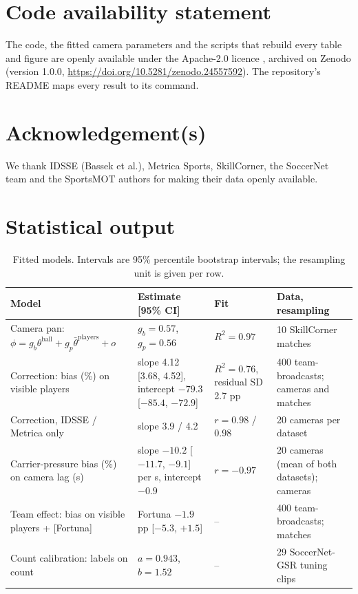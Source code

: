 \documentclass[]{interact}
\begin{document}
\section*{Code availability statement}
The code, the fitted camera parameters and the scripts that rebuild every table and figure are openly available under
the Apache-2.0 licence \citep{pitchlens}, archived on Zenodo (version 1.0.0,
\url{https://doi.org/10.5281/zenodo.24557592}). The repository's README maps every result to its command.

\section*{Acknowledgement(s)}
We thank IDSSE (Bassek et al.), Metrica Sports, SkillCorner, the SoccerNet team and the SportsMOT authors for making
their data openly available.




\appendix
\section{Statistical output}
\label{app:stats}

\begin{table}[ht]
\centering
\caption{Fitted models. Intervals are 95\% percentile bootstrap intervals; the resampling unit is given per row.}
\label{tab:models}
\small
\begin{tabular}{p{3.4cm}p{3.9cm}p{1.9cm}p{2.6cm}}
\toprule
Model & Estimate [95\% CI] & Fit & Data, resampling \\
\midrule
Camera pan: $\phi = g_b\theta^{\text{ball}} + g_p\bar\theta^{\text{players}} + o$ & $g_b = 0.57$, $g_p = 0.56$ &
$R^2 = 0.97$ & 10 SkillCorner matches \\
Correction: bias (\%) on visible players & slope 4.12 [3.68, 4.52], intercept $-79.3$ [$-85.4$, $-72.9$] &
$R^2 = 0.76$, residual SD 2.7 pp & 400 team-broadcasts; cameras and matches \\
Correction, IDSSE / Metrica only & slope 3.9 / 4.2 & $r = 0.98$ / 0.98 & 20 cameras per dataset \\
Carrier-pressure bias (\%) on camera lag (s) & slope $-10.2$ [$-11.7$, $-9.1$] per s, intercept $-0.9$ & $r = -0.97$
& 20 cameras (mean of both datasets); cameras \\
Team effect: bias on visible players + [Fortuna] & Fortuna $-1.9$ pp [$-5.3$, $+1.5$] & -- & 400 team-broadcasts;
matches \\
Count calibration: labels on count & $a = 0.943$, $b = 1.52$ & -- & 29 SoccerNet-GSR tuning clips \\
\bottomrule
\end{tabular}
\end{table}
\end{document}
